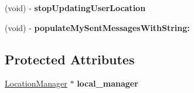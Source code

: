 \begin{DoxyCompactItemize}
\item 
\hypertarget{interface_u_s_e_r_i_n_f_o_r_m_a_t_i_o_n_a_n_d_a_p_p_s_t_a_t_e_a60aa5d216b30f0a75aad916e67ec95c6}{
(void) -\/ {\bfseries stop\-Updating\-User\-Location}}
\label{interface_u_s_e_r_i_n_f_o_r_m_a_t_i_o_n_a_n_d_a_p_p_s_t_a_t_e_a60aa5d216b30f0a75aad916e67ec95c6}

\item 
\hypertarget{interface_u_s_e_r_i_n_f_o_r_m_a_t_i_o_n_a_n_d_a_p_p_s_t_a_t_e_a239cdc67fac9b3b2d8cd9ee1dcd6c40c}{
(void) -\/ {\bfseries populate\-My\-Sent\-Messages\-With\-String\-:}}
\label{interface_u_s_e_r_i_n_f_o_r_m_a_t_i_o_n_a_n_d_a_p_p_s_t_a_t_e_a239cdc67fac9b3b2d8cd9ee1dcd6c40c}

\end{DoxyCompactItemize}
\subsection*{\-Protected \-Attributes}
\begin{DoxyCompactItemize}
\item 
\hypertarget{interface_u_s_e_r_i_n_f_o_r_m_a_t_i_o_n_a_n_d_a_p_p_s_t_a_t_e_a04e576f193ce1859943622d76c3cf07c}{
\hyperlink{interface_location_manager}{\-Location\-Manager} $\ast$ {\bfseries local\-\_\-manager}}
\label{interface_u_s_e_r_i_n_f_o_r_m_a_t_i_o_n_a_n_d_a_p_p_s_t_a_t_e_a04e576f193ce1859943622d76c3cf07c}

\end{DoxyCompactItemize}
